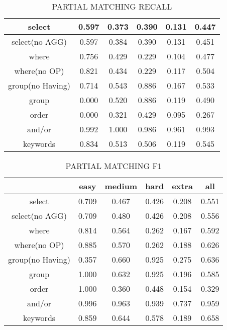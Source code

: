 \begin{table}[h!]
    \centering
    \begin{tabular}{|c|c|c|c|c|c|}
        \hline
        select           & 0.597 & 0.373 & 0.390 & 0.131 & 0.447 \\ \hline
        select(no AGG)   & 0.597 & 0.384 & 0.390 & 0.131 & 0.451 \\ \hline
        where            & 0.756 & 0.429 & 0.229 & 0.104 & 0.477 \\ \hline
        where(no OP)     & 0.821 & 0.434 & 0.229 & 0.117 & 0.504 \\ \hline
        group(no Having) & 0.714 & 0.543 & 0.886 & 0.167 & 0.533 \\ \hline
        group            & 0.000 & 0.520 & 0.886 & 0.119 & 0.490 \\ \hline
        order            & 0.000 & 0.321 & 0.429 & 0.095 & 0.267 \\ \hline
        and/or           & 0.992 & 1.000 & 0.986 & 0.961 & 0.993 \\ \hline

        keywords         & 0.834 & 0.513 & 0.506 & 0.119 & 0.545 \\ \hline
    \end{tabular}
    \caption{PARTIAL MATCHING RECALL }

\end{table}
\begin{table}[h!]
    \centering
    \begin{tabular}{|c|c|c|c|c|c|}
        \hline
                         & easy  & medium & hard  & extra & all   \\ \hline
        select           & 0.709 & 0.467  & 0.426 & 0.208 & 0.551 \\ \hline
        select(no AGG)   & 0.709 & 0.480  & 0.426 & 0.208 & 0.556 \\ \hline
        where            & 0.814 & 0.564  & 0.262 & 0.167 & 0.592 \\ \hline
        where(no OP)     & 0.885 & 0.570  & 0.262 & 0.188 & 0.626 \\ \hline
        group(no Having) & 0.357 & 0.660  & 0.925 & 0.275 & 0.636 \\ \hline
        group            & 1.000 & 0.632  & 0.925 & 0.196 & 0.585 \\ \hline
        order            & 1.000 & 0.360  & 0.448 & 0.154 & 0.329 \\ \hline
        and/or           & 0.996 & 0.963  & 0.939 & 0.737 & 0.959 \\ \hline

        keywords         & 0.859 & 0.644  & 0.578 & 0.189 & 0.658 \\ \hline
    \end{tabular}
    \caption{PARTIAL MATCHING F1 }

\end{table}
